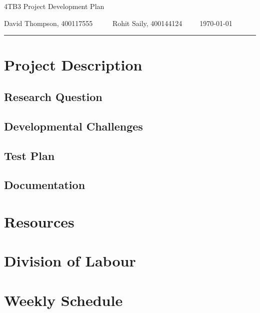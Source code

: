 \documentclass{article}
\author{Rohit Saily, David Thompson, Raymond Tu}
\date{\today}
\title{\mytitle}
\newcommand{\mytitle}{4TB3 Project Development Plan}
\begin{document}
{\sffamily
{\huge \mytitle}

\medskip

David Thompson, 400117555~~~~~
Rohit Saily, 400144124~~~~~\today
}

\par\noindent\rule{\textwidth}{0.4pt}
\bigskip

\section{Project Description}

\subsection{Research Question}

\subsection{Developmental Challenges}

\subsection{Test Plan}

\subsection{Documentation}

\section{Resources}

\section{Division of Labour}

\section{Weekly Schedule}
\end{document}
